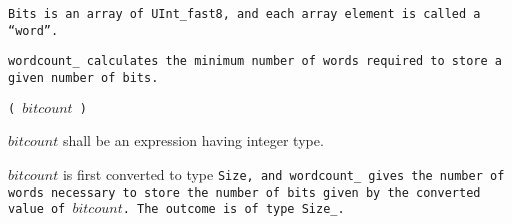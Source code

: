 \tt{Bits} is an array of \tt{UInt_fast8},
and each array element is called a ``word''.

\tt{wordcount_} calculates the minimum number of
words required to store a given number of bits.


 \tt{(} $bitcount$ \tt{)}


$bitcount$ shall be an expression having integer type.


$bitcount$ is first converted to type \tt{Size}, and
\tt{wordcount_} gives the number of words necessary to store
the number of bits given by the converted value of $bitcount$.
The outcome is of type \tt{Size_}.
